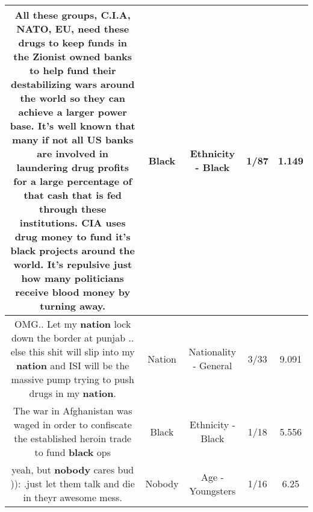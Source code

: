 \documentclass[11pt]{article}
\newlength\mylength
\begin{document}
\begin{center}
\begin{longtable}{|C{.65\mylength}|C{.30\mylength}|C{.12\mylength}|C{.12\mylength}|C{.12\mylength}|}
  \small All these groups, C.I.A, NATO, EU, need these drugs to keep funds in the Zionist owned banks to help fund their destabilizing wars around the world so they can achieve a larger power base.  It's well known that many if not all US banks are involved in laundering drug profits for a large percentage of that cash that is fed through these institutions.  CIA uses drug money to fund it's \textbf{black} projects around the world.  It's repulsive just how many politicians receive blood money by turning away.\normalsize   & Black & Ethnicity - Black & 1/87 & 1.149 \\  \hline
  \small OMG.. Let my \textbf{nation} lock down the border at punjab .. else this shit will slip into my \textbf{nation} and ISI will be the massive pump trying to push drugs in my \textbf{nation}.\normalsize   & Nation & Nationality - General & 3/33 & 9.091 \\  \hline
  \small The war in Afghanistan was waged in order to confiscate the established heroin trade to fund \textbf{black} ops\normalsize   & Black & Ethnicity - Black & 1/18 & 5.556 \\  \hline
  \small yeah, but \textbf{nobody} cares bud )): .just let them talk and die in theyr awesome mess.\normalsize   & Nobody & Age - Youngsters & 1/16 & 6.25 \\  \hline
  
\end{longtable}
\end{center}
\end{document}
